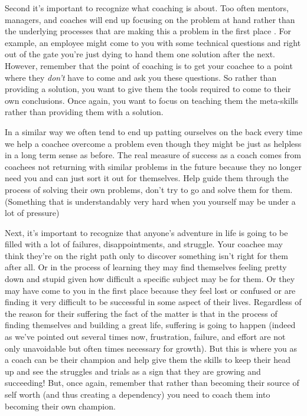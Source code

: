 \documentclass[11pt]{book}
\begin{document}
Second it's important to recognize what coaching is about. Too often mentors, managers, and coaches will end up focusing on the problem at hand rather than the underlying processes that are making this a problem in the first place \cite{coactive} \cite{stanier}. For example, an employee might come to you with some technical questions and right out of the gate you're just dying to hand them one solution after the next. However, remember that the point of coaching is to get your coachee to a point where they \textit{don't} have to come and ask you these questions. So rather than providing a solution, you want to give them the tools required to come to their own conclusions. Once again, you want to focus on teaching them the meta-skills rather than providing them with a solution. 
\newline

In a similar way we often tend to end up patting ourselves on the back every time we help a coachee overcome a problem even though they might be just as helpless in a long term sense as before. The real measure of success as a coach comes from coachees not returning with similar problems in the future because they no longer need you and can just sort it out for themselves. Help guide them through the process of solving their own problems, don't try to go and solve them for them. (Something that is understandably very hard when you yourself may be under a lot of pressure)
\newline

Next, it's important to recognize that anyone's adventure in life is going to be filled with a lot of failures, disappointments, and struggle. Your coachee may think they're on the right path only to discover something isn't right for them after all. Or in the process of learning they may find themselves feeling pretty down and stupid given how difficult a specific subject may be for them. Or they may have come to you in the first place because they feel lost or confused or are finding it very difficult to be successful in some aspect of their lives. Regardless of the reason for their suffering the fact of the matter is that in the process of finding themselves and building a great life, suffering is going to happen (indeed as we've pointed out several times now, frustration, failure, and effort are not only unavoidable but often times necessary for growth). But this is where you as a coach can be their champion and help give them the skills to keep their head up and see the struggles and trials as a sign that they are growing and succeeding! But, once again, remember that rather than becoming their source of self worth (and thus creating a dependency) you need to coach them into becoming their own champion. 
\newline
\end{document}
